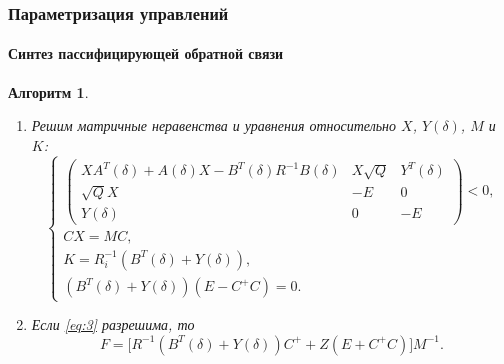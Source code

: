 \documentclass[ignorenonframetext,hyperref={pdftex,unicode},compress,handout]{beamer}
\newtheorem{alg}{Алгоритм}
\begin{document}
\begin{frame}
    \frametitle{Параметризация управлений}
    \framesubtitle{Синтез пассифицирующей обратной связи}
    \tiny
    \begin{alg}
        \begin{enumerate}
            \item
            \par Решим матричные неравенства и уравнения относительно $X$, $Y(\delta)$, $M$ и $K$:
            \begin{equation}
            \label{eq:3}
                \left\{
                    \begin{array}{l}
                        \left(
                            \begin{array}{ccc}
                                XA^T(\delta) + A(\delta)X - B^T(\delta)R^{-1}B(\delta)   &   X\sqrt{Q}   &   Y^T(\delta)   \\
                                \sqrt{Q}X   &   -E   &   0 \\
                                Y(\delta)   &   0   &   -E
                            \end{array}
                        \right) < 0\mbox{,} \\
                        CX = MC\mbox{,} \\
                        K = R_i^{-1}(B^T(\delta) + Y(\delta))\mbox{,} \\
                        (B^T(\delta) + Y(\delta))(E - C^+C) = 0\mbox{.}
                    \end{array}
                \right.
            \end{equation}

            \item
            \par Если \ref{eq:3} разрешима, то
            \begin{equation}
                F = \big[ R^{-1}(B^T(\delta) + Y(\delta))C^+ + Z(E + C^+C) \big]M^{-1}\mbox{.}
            \end{equation}


\end{enumerate}
\end{alg}
\end{frame}
\end{document}
